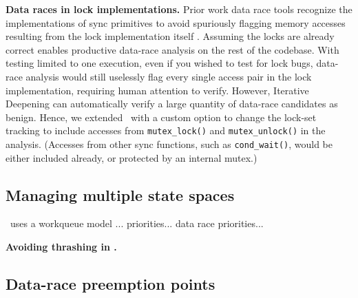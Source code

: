 {\bf Data races in lock implementations.}
Prior work data race tools recognize the implementations of sync primitives to avoid spuriously flagging memory accesses resulting from the lock implementation itself \cite{tsan}.
Assuming the locks are already correct enables productive data-race analysis on the rest of the codebase.
With testing limited to one execution, even if you wished to test for lock bugs, data-race analysis would still uselessly flag every single access pair in the lock implementation, requiring human attention to verify.
However, Iterative Deepening can automatically verify a large quantity of data-race candidates as benign.
Hence, we extended \landslide~with a custom option to change the lock-set tracking to include accesses from {\tt mutex\_lock()} and {\tt mutex\_unlock()} in the analysis. (Accesses from other sync functions, such as {\tt cond\_wait()}, would be either included already, or protected by an internal mutex.)

\subsection{Managing multiple state spaces}

\quicksand~uses a workqueue model
...
priorities... data race priorities...



{\bf Avoiding thrashing in \quicksand.} %


\subsection{Data-race preemption points}


